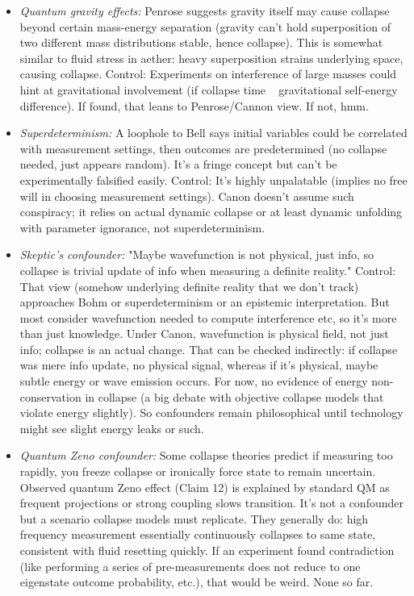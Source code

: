 \documentclass[11pt]{article}
\begin{document}
\begin{itemize}
\item 
\textit{Quantum gravity effects:} Penrose suggests gravity itself may cause collapse beyond certain mass-energy separation (gravity can't hold superposition of two different mass distributions stable, hence collapse). This is somewhat similar to fluid stress in aether: heavy superposition strains underlying space, causing collapse. Control: Experiments on interference of large masses could hint at gravitational involvement (if collapse time ~ gravitational self-energy difference). If found, that leans to Penrose/Cannon view. If not, hmm.




\item 
\textit{Superdeterminism:} A loophole to Bell says initial variables could be correlated with measurement settings, then outcomes are predetermined (no collapse needed, just appears random). It's a fringe concept but can't be experimentally falsified easily. Control: It's highly unpalatable (implies no free will in choosing measurement settings). Canon doesn’t assume such conspiracy; it relies on actual dynamic collapse or at least dynamic unfolding with parameter ignorance, not superdeterminism.




\item 
\textit{Skeptic's confounder:} "Maybe wavefunction is not physical, just info, so collapse is trivial update of info when measuring a definite reality." Control: That view (somehow underlying definite reality that we don't track) approaches Bohm or superdeterminism or an epistemic interpretation. But most consider wavefunction needed to compute interference etc, so it's more than just knowledge. Under Canon, wavefunction is physical field, not just info; collapse is an actual change. That can be checked indirectly: if collapse was mere info update, no physical signal, whereas if it's physical, maybe subtle energy or wave emission occurs. For now, no evidence of energy non-conservation in collapse (a big debate with objective collapse models that violate energy slightly). So confounders remain philosophical until technology might see slight energy leaks or such.




\item 
\textit{Quantum Zeno confounder:} Some collapse theories predict if measuring too rapidly, you freeze collapse or ironically force state to remain uncertain. Observed quantum Zeno effect (Claim 12) is explained by standard QM as frequent projections or strong coupling slows transition. It's not a confounder but a scenario collapse models must replicate. They generally do: high frequency measurement essentially continuously collapses to same state, consistent with fluid resetting quickly. If an experiment found contradiction (like performing a series of pre-measurements does not reduce to one eigenstate outcome probability, etc.), that would be weird. None so far.





\end{itemize}
\end{document}

